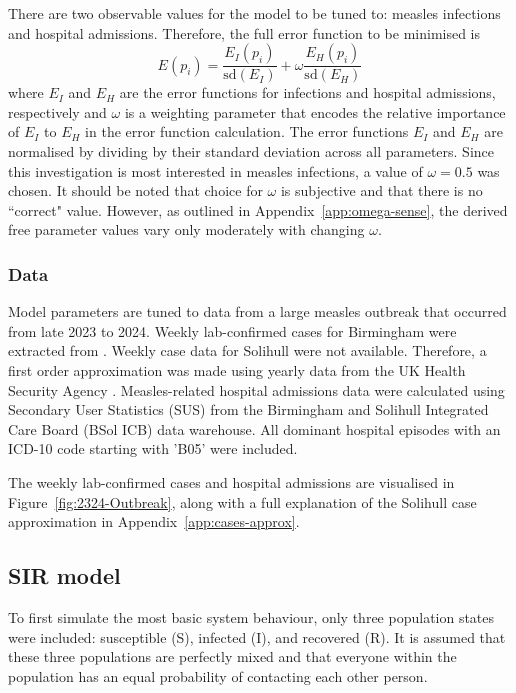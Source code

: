 \documentclass{article}
\begin{document}
There are two observable values for the model to be tuned to: measles infections and hospital admissions. Therefore, the full error function to be minimised is
%
\begin{equation}
    E(p_i) = \frac{E_I(p_i)}{\mathrm{sd}(E_I)} + \omega \frac{E_H(p_i)}{\mathrm{sd}(E_H)}
    \label{eq:error-comb}
\end{equation}
%
where $E_I$ and $E_H$ are the error functions for infections and hospital admissions, respectively and $\omega$ is a weighting parameter that encodes the relative importance of $E_I$ to $E_H$ in the error function calculation. The error functions $E_I$ and $E_H$ are normalised by dividing by their standard deviation across all parameters. Since this investigation is most interested in measles infections, a value of $\omega = 0.5$ was chosen. It should be noted that choice for $\omega$ is subjective and that there is no ``correct" value. However, as outlined in Appendix~\ref{app:omega-sense}, the derived free parameter values vary only moderately with changing $\omega$.

\subsubsection{Data}

Model parameters are tuned to data from a large measles outbreak that occurred from late 2023 to 2024. Weekly lab-confirmed cases for Birmingham were extracted from \citeauthor{jary2025sociodemographic} \cite{jary2025sociodemographic}. Weekly case data for Solihull were not available. Therefore, a first order approximation was made using yearly data from the UK Health Security Agency \cite{ukhsa_measles_2023_2026}. Measles-related hospital admissions data were calculated using Secondary User Statistics (SUS) from the Birmingham and Solihull Integrated Care Board (BSol ICB) data warehouse. All dominant hospital episodes with an ICD-10 code starting with 'B05' were included. 

The weekly lab-confirmed cases and hospital admissions are visualised in Figure~\ref{fig:2324-Outbreak}, along with a full explanation of the Solihull case approximation in Appendix~\ref{app:cases-approx}. 

\subsection{SIR model}
\label{sec:sir}

To first simulate the most basic system behaviour, only three population states were included: susceptible (S), infected (I), and recovered (R). It is assumed that these three populations are perfectly mixed and that everyone within the population has an equal probability of contacting each other person.
\end{document}
